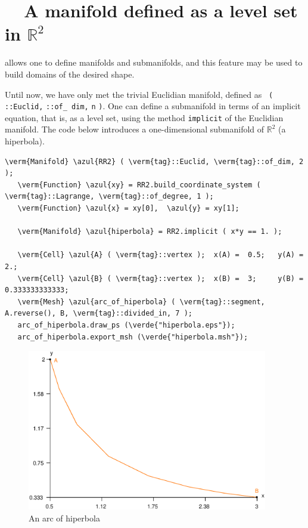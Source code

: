 \section{~~A manifold defined as a level set in $ \mathbb{R}^2 $}
\label{\numb section 2.\numb parag 4}

{\ManiFEM} allows one to define manifolds and submanifolds, and this feature may be
used to build domains of the desired shape.

Until now, we have only met the trivial Euclidian manifold, defined as {\small\tt
{}\break ( ::Euclid,} {\small\tt {}::of\_\,dim,} {\small\tt n}
{\small\tt )}.
One can define a submanifold in terms of an implicit equation, that is, as a level set,
using the method {\small\tt implicit} of the Euclidian manifold.
The code below introduces a one-dimensional submanifold of $ \mathbb{R}^2 $ (a hiperbola).

\begin{Verbatim}[commandchars=\\\{\},formatcom=\small\tt,frame=single,
   label=parag-\ref{\numb section 2.\numb parag 4}.cpp,rulecolor=\color{coment},
   baselinestretch=0.94,framesep=2mm]
   \verm{Manifold} \azul{RR2} ( \verm{tag}::Euclid, \verm{tag}::of_dim, 2 );
   \verm{Function} \azul{xy} = RR2.build_coordinate_system ( \verm{tag}::Lagrange, \verm{tag}::of_degree, 1 );
   \verm{Function} \azul{x} = xy[0],  \azul{y} = xy[1];
   
   \verm{Manifold} \azul{hiperbola} = RR2.implicit ( x*y == 1. );
   
   \verm{Cell} \azul{A} ( \verm{tag}::vertex );  x(A) =  0.5;   y(A) =  2.;
   \verm{Cell} \azul{B} ( \verm{tag}::vertex );  x(B) =  3;     y(B) =  0.333333333333;
   \verm{Mesh} \azul{arc_of_hiperbola} ( \verm{tag}::segment, A.reverse(), B, \verm{tag}::divided_in, 7 );
   arc_of_hiperbola.draw_ps (\verde{"hiperbola.eps"});
   arc_of_hiperbola.export_msh (\verde{"hiperbola.msh"});
\end{Verbatim}

\begin{figure}[ht] \centering
  \includegraphics[width=105mm]{hiperbola}
  \caption{An arc of hiperbola}
  \label{\numb section 2.\numb fig 4}
\end{figure}

